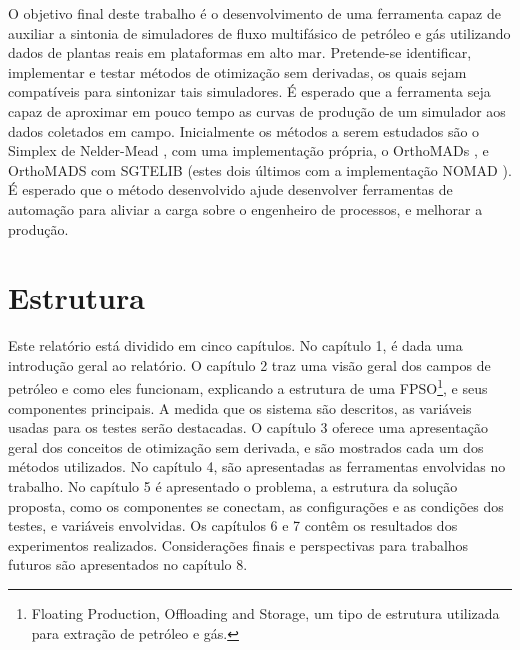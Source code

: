 O objetivo final deste trabalho é o desenvolvimento de uma ferramenta capaz de auxiliar a sintonia de simuladores de fluxo multifásico de petróleo e gás utilizando dados de plantas reais em plataformas em alto mar. 
%
Pretende-se identificar, implementar e testar métodos de otimização sem derivadas, os quais sejam compatíveis para sintonizar tais simuladores.
%
É esperado que a ferramenta seja capaz de aproximar em pouco tempo as curvas de produção de um simulador aos dados coletados em campo.
%
Inicialmente os métodos a serem estudados são o Simplex de Nelder-Mead \cite{Singer:2009}, com uma implementação própria, o OrthoMADs \cite{DBLP:journals/siamjo/AbramsonADD09}, e OrthoMADS com SGTELIB (estes dois últimos com a implementação NOMAD \cite{Nomad}).
%
É esperado que o método desenvolvido ajude desenvolver ferramentas de automação para aliviar a carga sobre o engenheiro de processos, e melhorar a produção.
%

%
\section{Estrutura}

Este relatório está dividido em cinco capítulos.
%
No capítulo 1, é dada uma introdução geral ao relatório.
%
O capítulo 2 traz uma visão geral dos campos de petróleo e como eles funcionam, explicando a estrutura de uma FPSO\footnote{Floating Production, Offloading and Storage, um tipo de estrutura utilizada para extração de petróleo e gás.}, e seus componentes principais. 
%
A medida que os sistema são descritos, as variáveis usadas para os testes serão destacadas.
%
O capítulo 3 oferece uma apresentação geral dos conceitos de otimização sem derivada, e são mostrados cada um dos métodos utilizados.
%
No capítulo 4, são apresentadas as ferramentas envolvidas no trabalho.
%
No capítulo 5 é apresentado o problema, a estrutura da solução proposta, como os componentes se conectam, as configurações e as condições dos testes, e variáveis envolvidas.
%
Os capítulos 6 e 7 contêm os resultados dos experimentos realizados.
%
Considerações finais e perspectivas para trabalhos futuros são apresentados no capítulo 8.

 

